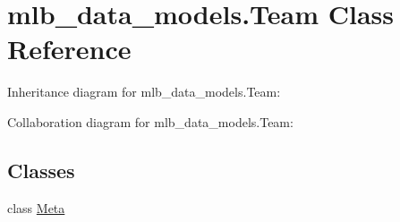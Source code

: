 \hypertarget{classmlb__data__models_1_1Team}{}\section{mlb\+\_\+data\+\_\+models.\+Team Class Reference}
\label{classmlb__data__models_1_1Team}


Inheritance diagram for mlb\+\_\+data\+\_\+models.\+Team\+:


Collaboration diagram for mlb\+\_\+data\+\_\+models.\+Team\+:
\subsection*{Classes}
\begin{DoxyCompactItemize}
\item 
class \hyperlink{classmlb__data__models_1_1Team_1_1Meta}{Meta}
\end{DoxyCompactItemize}
